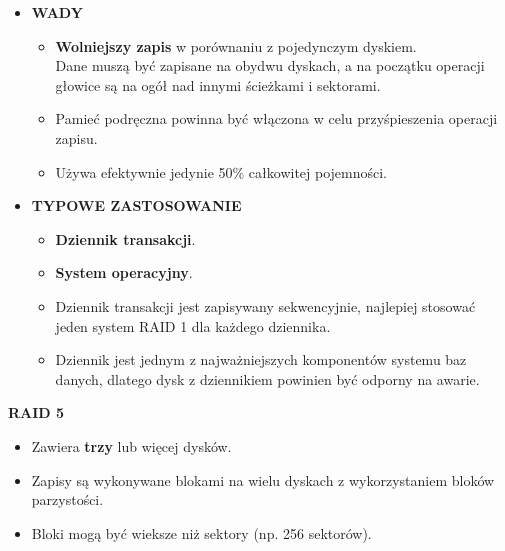 \documentclass[a5paper,6pt]{article}
\begin{document}
\begin{itemize}
        \item \textbf{WADY}
        \begin{itemize}
            \item \textbf{Wolniejszy zapis} w porównaniu z pojedynczym
                  dyskiem.\\
                  Dane muszą być zapisane na obydwu dyskach, a na początku
                  operacji głowice są na ogół nad innymi ścieżkami i sektorami.
            \item Pamieć podręczna powinna być włączona w celu przyśpieszenia
                  operacji zapisu.
            \item Używa efektywnie jedynie 50\% całkowitej pojemności.
        \end{itemize}

        \item \textbf{TYPOWE ZASTOSOWANIE}
        \begin{itemize}
            \item \textbf{Dziennik transakcji}.
            \item \textbf{System operacyjny}.
            \item Dziennik transakcji jest zapisywany sekwencyjnie, najlepiej
                  stosować jeden system RAID 1 dla każdego dziennika.
            \item Dziennik jest jednym z najważniejszych komponentów systemu
                  baz danych, dlatego dysk z dziennikiem powinien być odporny
                  na awarie.
        \end{itemize}

    \end{itemize}

\pagebreak

    \textbf{RAID 5}
    \begin{itemize}
        \item Zawiera \textbf{trzy} lub więcej dysków.
        \item Zapisy są wykonywane blokami na wielu dyskach z wykorzystaniem
              bloków parzystości.
        \item Bloki mogą być wieksze niż sektory (np. 256 sektorów).
    \end{itemize}
\end{document}
